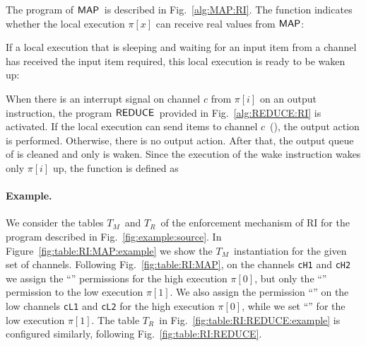 \documentclass[10pt,a4paper,oneside]{article}
\def\intsig#1{\ensuremath{#1}}
\def\TAV{\ensuremath{T_{M}}}
\def\TPV{\ensuremath{T_{R}}}
\def\chnl{\ensuremath{c}}
\def\sanserif#1{\ensuremath{\sf #1}}
\def\REDUCE{\ensuremath{\sanserif{REDUCE}}}
\def\MAP{\ensuremath{\sanserif{MAP}}}
\def\Prog{\ensuremath{\pi}}
\def\Progl#1{\ensuremath{\Prog[#1]}}
\def\linecode#1{{\texttt{#1}}}
\begin{document}
The program of \MAP\ is described in Fig.~\ref{alg:MAP:RI}. The function  indicates whether the local execution \Progl{x} can receive real values from \MAP:


If a local execution that is sleeping and waiting for an input item from a channel has received the input item required, this local execution is ready to be waken up:






When there is an interrupt signal on channel \intsig{\chnl} from \Progl{i} on an output instruction, the program \REDUCE\ provided in Fig.~\ref{alg:REDUCE:RI} is activated. If the local execution  can send items to channel \chnl\ (), the output action is performed. Otherwise, there is no output action. After that, the output queue of  is cleaned and only  is waken. Since the execution of the wake instruction wakes only \Progl{i} up, the function  is defined as


\paragraph{Example.}
We consider the tables \TAV\ and \TPV\ of the enforcement mechanism of RI for the program described in Fig.~\ref{fig:example:source}. In Figure~\ref{fig:table:RI:MAP:example} we show the \TAV\ instantiation for the given set of channels. Following Fig.~\ref{fig:table:RI:MAP}, on the channels \linecode{cH1} and \linecode{cH2}  we assign the ``'' permissions for the high execution \Progl{0}, but only the ``'' permission to the low execution \Progl{1}.  We also assign the permission ``'' on the low channels \linecode{cL1} and \linecode{cL2} for the high execution \Progl{0}, while we set ``'' for the low execution \Progl{1}. The table \TPV\ in Fig.~\ref{fig:table:RI:REDUCE:example} is configured similarly, following Fig.~\ref{fig:table:RI:REDUCE}.
\end{document}
